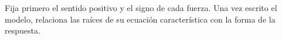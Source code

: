 Fija primero el sentido positivo y el signo de cada fuerza. Una vez escrito el modelo, relaciona las raíces de su ecuación característica con la forma de la respuesta.
